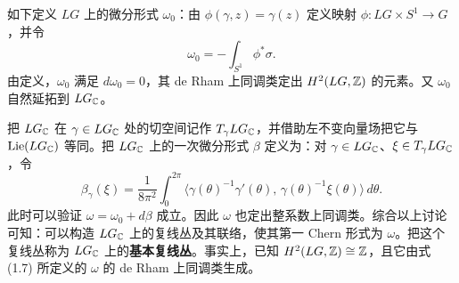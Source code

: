 
如下定义 $LG$ 上的微分形式 $\omega_{0}$：由 $\phi(\gamma,z)=\gamma(z)$ 定义映射 $\phi\colon LG\times S^{1}\to G$，并令
\[
  \omega_{0}=-\int_{S^{1}}\phi^{*}\sigma .
\]
由定义，$\omega_{0}$ 满足 $d\omega_{0}=0$，其 de Rham 上同调类定出 $H^{2}(LG,\mathbb{Z})$ 的元素。又 $\omega_{0}$ 自然延拓到 $LG_{\mathbb{C}}$。

把 $LG_{\mathbb{C}}$ 在 $\gamma\in LG_{\mathbb{C}}$ 处的切空间记作 $T_{\gamma}LG_{\mathbb{C}}$，并借助左不变向量场把它与 $\operatorname{Lie}(LG_{\mathbb{C}})$ 等同。把 $LG_{\mathbb{C}}$ 上的一次微分形式 $\beta$ 定义为：对 $\gamma\in LG_{\mathbb{C}}$、$\xi\in T_{\gamma}LG_{\mathbb{C}}$，令
\[
  \beta_{\gamma}(\xi)=\frac{1}{8\pi^{2}}\int_{0}^{2\pi}
  \bigl\langle \gamma(\theta)^{-1}\gamma'(\theta),\,
  \gamma(\theta)^{-1}\xi(\theta)\bigr\rangle\,d\theta .
\]
此时可以验证 $\omega=\omega_{0}+d\beta$ 成立。因此 $\omega$ 也定出整系数上同调类。综合以上讨论可知：可以构造 $LG_{\mathbb{C}}$ 上的复线丛及其联络，使其第一 Chern 形式为 $\omega$。把这个复线丛称为 $LG_{\mathbb{C}}$ 上的\textbf{基本复线丛}。事实上，已知 $H^{2}(LG,\mathbb{Z})\cong\mathbb{Z}$，且它由式 (1.7) 所定义的 $\omega$ 的 de Rham 上同调类生成。


